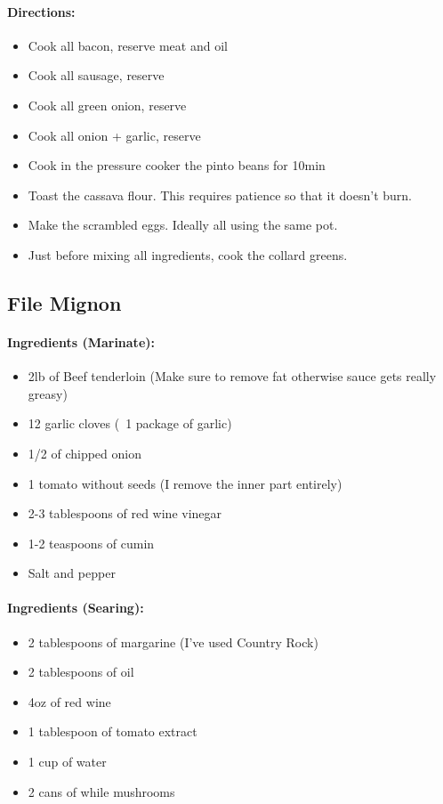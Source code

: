 \documentclass{article}
\begin{document}
\paragraph{Directions:}
\begin{itemize}
	\item Cook all bacon, reserve meat and oil
	\item Cook all sausage, reserve	
	\item Cook all green onion, reserve
	\item Cook all onion + garlic, reserve
	\item Cook in the pressure cooker the pinto beans for 10min
	\item Toast the cassava flour. This requires patience so that it doesn't burn.
	\item Make the scrambled eggs. Ideally all using the same pot.
	\item Just before mixing all ingredients, cook the collard greens.
\end{itemize}

\subsection{File Mignon}

\paragraph{Ingredients (Marinate):}
\begin{itemize}
	\item 2lb of Beef tenderloin (Make sure to remove fat otherwise sauce gets really greasy)
	\item 12 garlic cloves (~1 package of garlic)
	\item 1/2 of chipped onion
	\item 1 tomato without seeds (I remove the inner part entirely)
	\item 2-3 tablespoons of red wine vinegar
	\item 1-2 teaspoons of cumin
	\item Salt and pepper
\end{itemize}

\paragraph{Ingredients (Searing):}
\begin{itemize}
	\item 2 tablespoons of margarine (I've used Country Rock)
	\item 2 tablespoons of oil
	\item 4oz of red wine
	\item 1 tablespoon of tomato extract
	\item 1 cup of water
	\item 2 cans of while mushrooms
\end{itemize}
\end{document}
